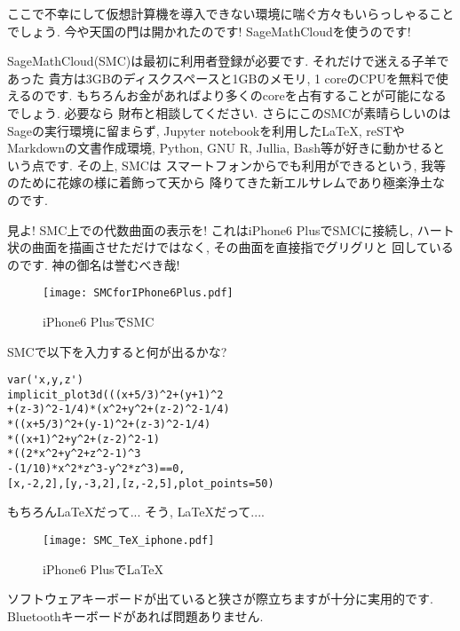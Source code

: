 ここで不幸にして仮想計算機を導入できない環境に喘ぐ方々もいらっしゃることでしょう.
 今や天国の門は開かれたのです! SageMathCloudを使うのです!
\newline

SageMathCloud(SMC)は最初に利用者登録が必要です. それだけで迷える子羊であった
貴方は3GBのディスクスペースと1GBのメモリ, 1 coreのCPUを無料で使えるのです.
 もちろんお金があればより多くのcoreを占有することが可能になるでしょう. 必要なら
財布と相談してください. さらにこのSMCが素晴らしいのはSageの実行環境に留まらず,
 Jupyter notebookを利用した{\LaTeX}, reSTやMarkdownの文書作成環境,
 Python, GNU R, Jullia, Bash等が好きに動かせるという点です. その上, SMCは
スマートフォンからでも利用ができるという, 我等のために花嫁の様に着飾って天から
降りてきた新エルサレムであり極楽浄土なのです. 
\newline

見よ! SMC上での代数曲面の表示を! これはiPhone6 PlusでSMCに接続し,
ハート状の曲面を描画させただけではなく, その曲面を直接指でグリグリと
回しているのです. 神の御名は誉むべき哉!

\begin{figure}[htbp]
\begin{center}
\texttt{[image: SMCforIPhone6Plus.pdf]}
\caption{iPhone6 PlusでSMC}
\label{fig:smc4iphone}
\end{center}
\end{figure}

SMCで以下を入力すると何が出るかな?

\begin{lstlisting}[caption=みんなで入れようクマー,
frame=tlRB,numberstyle=\footnotesize,basicstyle=\footnotesize]
var('x,y,z')
implicit_plot3d(((x+5/3)^2+(y+1)^2
+(z-3)^2-1/4)*(x^2+y^2+(z-2)^2-1/4)
*((x+5/3)^2+(y-1)^2+(z-3)^2-1/4)
*((x+1)^2+y^2+(z-2)^2-1)
*((2*x^2+y^2+z^2-1)^3
-(1/10)*x^2*z^3-y^2*z^3)==0, 
[x,-2,2],[y,-3,2],[z,-2,5],plot_points=50)
\end{lstlisting}

もちろん{\LaTeX}だって... そう, {\LaTeX}だって....
\newline

\begin{figure}[htbp]
\begin{center}
\texttt{[image: SMC\_TeX\_iphone.pdf]}
\caption{iPhone6 Plusで{\LaTeX}}
\label{fig:smctex}
\end{center}
\end{figure}

ソフトウェアキーボードが出ていると狭さが際立ちますが十分に実用的です.
 Bluetoothキーボードがあれば問題ありません. 

